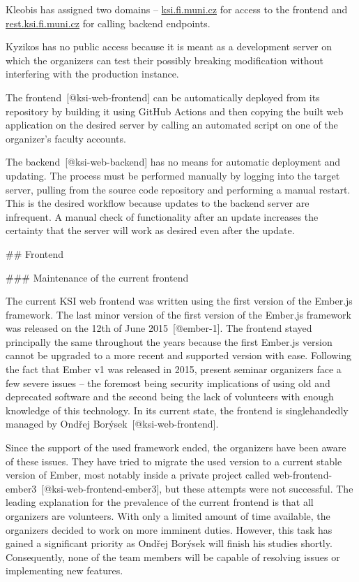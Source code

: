\documentclass[
  digital, %
  oneside, %
  lof,     %
  nolot,     %
]{fithesis4}
\begin{document}
Kleobis has assigned two domains -- \href{https://ksi.fi.muni.cz}{ksi.fi.muni.cz} for access to the frontend and \href{https://rest.ksi.fi.muni.cz}{rest.ksi.fi.muni.cz} for calling backend endpoints.

Kyzikos has no public access because it is meant as a development server on which the organizers can test their possibly breaking modification without interfering with the production instance.

The frontend~[@ksi-web-frontend] can be automatically deployed from its repository by building it using GitHub Actions and then copying the built web application on the desired server by calling an automated script on one of the organizer's faculty accounts.

The backend~[@ksi-web-backend] has no means for automatic deployment and updating. The process must be performed manually by logging into the target server, pulling from the source code repository and performing a manual restart. This is the desired workflow because updates to the backend server are infrequent. A manual check of functionality after an update increases the certainty that the server will work as desired even after the update.

## Frontend

### Maintenance of the current frontend

The current \acrshort{KSI} web frontend was written using the first version of the Ember.js framework. The last minor version of the first version of the Ember.js framework was released on the 12th of June 2015~[@ember-1]. The frontend stayed principally the same throughout the years because the first Ember.js version cannot be upgraded to a more recent and supported version with ease. Following the fact that Ember v1 was released in 2015, present seminar organizers face a few severe issues -- the foremost being security implications of using old and deprecated software and the second being the lack of volunteers with enough knowledge of this technology. In its current state, the frontend is singlehandedly managed by Ondřej Borýsek~[@ksi-web-frontend].

Since the support of the used framework ended, the organizers have been aware of these issues. They have tried to migrate the used version to a current stable version of Ember, most notably inside a private project called web-frontend-ember3~[@ksi-web-frontend-ember3], but these attempts were not successful. The leading explanation for the prevalence of the current frontend is that all organizers are volunteers. With only a limited amount of time available, the organizers decided to work on more imminent duties. However, this task has gained a significant priority as Ondřej Borýsek will finish his studies shortly. Consequently, none of the team members will be capable of resolving issues or implementing new features.
\end{document}

